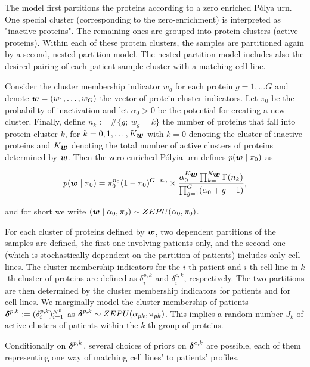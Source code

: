The model first partitions the proteins according to a zero enriched P\'olya urn. One special cluster (corresponding to the zero-enrichment) is interpreted as "inactive proteins". The remaining ones are grouped into protein clusters (active proteins). Within each of these protein clusters, the samples are partitioned again by a second, nested partition model. The nested partition model includes also the desired pairing of each patient sample cluster with a matching cell line. 

Consider the cluster membership indicator $w_g$ for each protein $g=1, \ldots G$ and denote $\mbox{\boldmath $w$}=(w_1, \ldots, w_{G})$ the vector of protein cluster indicators. Let $\pi_0$ be the probability of inactivation and let $\alpha_0> 0$ be the potential for creating a new cluster. Finally, define $n_k:= \#\{g; \ w_g=k\}$ the number of proteins that fall into protein cluster $k$, for $k=0, 1, \ldots, K_{\mbox{\boldmath $w$}}$ with $k=0$ denoting the cluster of inactive proteins and $K_{\mbox{\boldmath $w$}}$ denoting the total number of active clusters of proteins determined by $\mbox{\boldmath $w$}$. Then the zero enriched P\'olyia urn defines $p(\mbox{\boldmath $w$} \mid \pi_0)$ as

\begin{equation}
p(\mbox{\boldmath $w$} \mid \pi_0) = \pi^{n_0}_0(1-\pi_0)^{G-n_0} \times \frac{\alpha^{K_{\mbox{\boldmath $w$}}}_0 \prod^{K_{\mbox{\boldmath $w$}}}_{k=1}\Gamma(n_k)}{ \prod^G_{g=1} (\alpha_0 + g - 1)},
\end{equation}

\noindent and for short we write $(\mbox{\boldmath $w$} \mid \alpha_0, \pi_0) \sim ZEPU(\alpha_0, \pi_0)$.

For each cluster of proteins defined by $\mbox{\boldmath $w$}$, two dependent partitions of the samples are defined, the first one involving patients only, and the second one (which is stochastically  dependent on the partition of patients) includes only cell lines. The cluster membership indicators for the $i$-th patient and  $i$-th cell line in $k$-th cluster of proteins are defined as $\delta^{p,k}_i$ and $\delta^{c,k}_i$, respectively. The two partitions are then determined by the cluster membership indicators for patients and for cell lines. We marginally model the cluster membership of patients $\mbox{\boldmath $\delta$}^{p,k}:= (\delta^{p,k}_i)^{N^p}_{i=1}$ as $\mbox{\boldmath $\delta$}^{p,k}\sim ZEPU(\alpha_{pk}, \pi_{pk})$. This implies a random number $J_k$ of active clusters of patients within the $k$-th group of proteins.

Conditionally on $\mbox{\boldmath $\delta$}^{p,k}$, several choices of priors on $\mbox{\boldmath $\delta$}^{c,k}$ are possible, each of them representing one way of matching cell lines' to patients' profiles.\\


